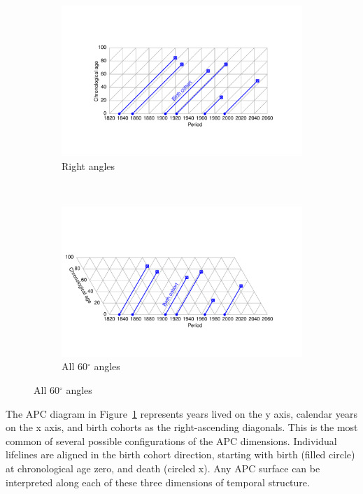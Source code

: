 \documentclass[11pt,oneside,a4paper]{article} %
\begin{document}
\begin{figure} 
\caption{An APC diagram in two projections.}
\label{fig:APC}
\centering
\begin{subfigure}{1.1\textwidth}
\caption{Right angles}
\vspace{-6em}
\label{fig:APCrt}
\includegraphics[scale=0.6]{Figures/APCrt.pdf}
\end{subfigure}
\\\vspace{-2em}
\begin{subfigure}{1.1\textwidth}
\caption{All 60$^\circ$ angles}
\vspace{-6em}
\label{fig:APCeq}
\includegraphics[scale=0.6]{Figures/APCeq.pdf}
\end{subfigure}
\end{figure}

The APC diagram in Figure~\ref{fig:APCrt} represents years lived on the y axis,
calendar years on the x axis, and birth cohorts as the right-ascending
diagonals. This is the most common of several possible configurations
of the APC dimensions. Individual lifelines are aligned in the birth cohort
direction, starting with birth (filled circle) at chronological age zero, and death
(circled x). Any APC surface can be interpreted along each of these
three dimensions of temporal structure. 
\end{document}

